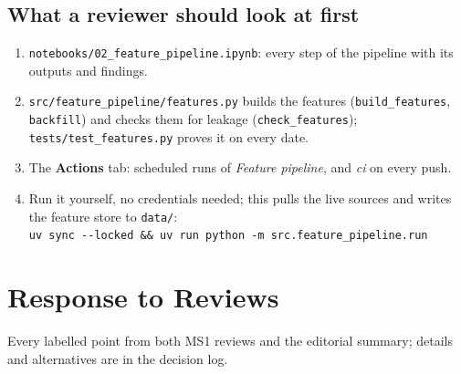 \documentclass[11pt,a4paper]{article}
\newcommand{\file}[1]{\texttt{#1}}
\begin{document}
	\subsection{What a reviewer should look at first}
	\begin{enumerate}
		\item \file{notebooks/02\_feature\_pipeline.ipynb}: every step of the pipeline with its outputs and findings.
		\item \file{src/feature\_pipeline/features.py} builds the features (\texttt{build\_features},
		\texttt{backfill}) and checks them for leakage (\texttt{check\_features}); \file{tests/test\_features.py}
		proves it on every date.
		\item The \textbf{Actions} tab: scheduled runs of \emph{Feature pipeline}, and \emph{ci} on every push.
		\item Run it yourself, no credentials needed; this pulls the live sources and writes the feature store to
		\file{data/}:\\ \texttt{uv sync -{}-locked \&\& uv run python -m src.feature\_pipeline.run}
	\end{enumerate}
	
	\section{Response to Reviews}
	Every labelled point from both MS1 reviews and the editorial summary; details and alternatives are in the
	decision log.
	
\end{document}
